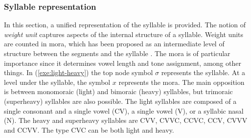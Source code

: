 \subsubsection{Syllable representation}
\label{sec:syllable-types}

In this section,  a unified representation of the syllable is provided. The
notion
of  {\it weight unit} captures aspects of the internal structure of a syllable.
Weight units are counted in mora, which has been proposed as an intermediate
level of structure between the segments and the syllable \citep{Hyma85}.   The
mora
is of particular importance since it determines vowel length and  tone
assignment, among other things.   In (\ref{exe:light-heavy}) the top node symbol
$\sigma$ represents the syllable. At a level under the syllable, the symbol $x$
represents the mora.  The main opposition is between monomoraic (light) and
bimoraic (heavy) syllables, but trimoraic (superheavy)  syllables are also
possible. The light syllables are composed of  a single consonant and a single
vowel (CV),  a single vowel (V), or  a syllabic nasal (N). The heavy and
superheavy syllables are  CVV,  CVVC, CCVC, CCV, CVVV and  CCVV. The type CVC
can be both light and heavy.   

